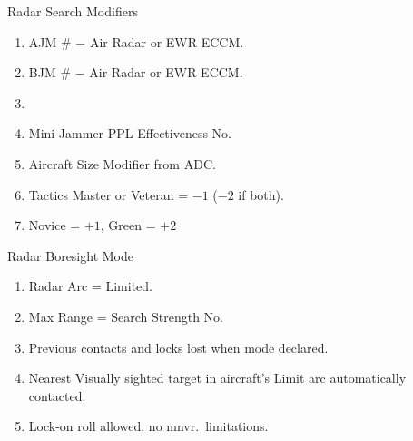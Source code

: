 \begin{table}
\centering
\caption{Radar Search Modifiers}
\medskip
\begin{minipage}{\linewidth}
\begin{enumerate}
    \item AJM \# $-$ Air Radar or EWR ECCM.
    \item BJM \# $-$ Air Radar or EWR ECCM.
    \item {}
    \item Mini-Jammer PPL Effectiveness No.
    \item Aircraft Size Modifier from ADC.
    \item Tactics Master or Veteran = $-1$ ($-2$ if both).
    \item Novice = $+1$, Green = $+2$
\end{enumerate}
\end{minipage}
\end{table}

\begin{table}
\centering
{}
\end{table}

\begin{table}
\centering
\caption{Radar Boresight Mode}
\medskip
\begin{minipage}{\linewidth}
\begin{enumerate}
    \item Radar Arc = Limited.
    \item Max Range = Search Strength No.
    \item Previous contacts and locks lost when mode declared.
    \item Nearest Visually sighted target in aircraft's Limit arc automatically contacted.
    \item Lock-on roll allowed, no mnvr.\ limitations.
\end{enumerate}
\end{minipage}
\end{table}

